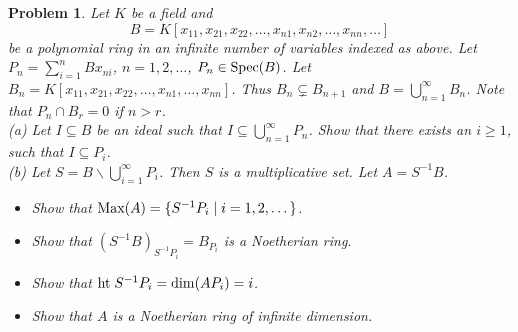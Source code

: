 \documentclass{article}
\newcommand{\spec}{\textup{Spec}}
\newcommand{\Ht}{\textup{ht}\;}
\newcommand{\Max}{\textup{Max}}
\newtheorem{problem}{Problem}
\begin{document}
\begin{problem}
Let $K$ be a field and
\[
B = K[x_{11}, x_{21}, x_{22}, \dots , x_{n1}, x_{n2}, \dots , x_{nn}, \dots ]
\]
be a polynomial ring in an infinite number of variables indexed as above. Let $P_n = \sum_{i=1}^n Bx_{ni}$, $n = 1, 2, \dots $, $P_n \in \spec(B)$. Let $B_n = K[x_{11}, x_{21}, x_{22}, \dots , x_{n1}, \dots , x_{nn}]$. Thus $B_n \subsetneq B_{n+1}$ and $B = \bigcup_{n=1}^{\infty} B_n$. Note that $P_n \cap B_r = 0$ if $n > r$.\\
(a) Let $I \subseteq B$ be an ideal such that $I \subseteq \bigcup_{n=1}^{\infty} P_n$. Show that there exists an $i \geq 1$, such that $I \subseteq P_i$.\\
(b) Let $S = B \backslash \bigcup_{i=1}^{\infty} P_i$. Then $S$ is a multiplicative set. Let $A = S^{-1}B$.
\begin{itemize}
\item[i)] Show that $\Max(A) = \{S^{-1}P_i \mid i = 1, 2, \dots \}$.
\item[ii)] Show that $(S^{-1}B)_{S^{-1}P_i} = B_{P_i}$ is a Noetherian ring.
\item[iii)] Show that $\Ht S^{-1}P_i = \dim(AP_i) = i$.
\item[iv)] Show that $A$ is a Noetherian ring of infinite dimension.
\end{itemize}
\end{problem}
\end{document}
